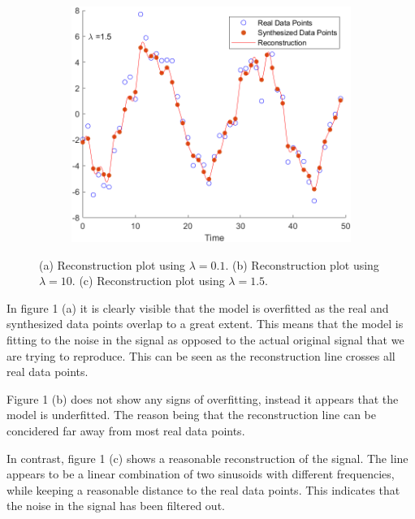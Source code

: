 \documentclass{article}
\begin{document}
\begin{figure}[h]
\\[\baselineskip]
\begin{subfigure}[h]{0.45\linewidth}
   \centering
   \includegraphics[width=\linewidth]{task43.png}
   \caption{}
   \label{fig:3}
\end{subfigure}
\centering
\caption{(a) Reconstruction plot using $\lambda = 0.1$. (b) Reconstruction plot using $\lambda = 10$. (c) Reconstruction plot using $\lambda = 1.5$.}
\end{figure}

In figure 1 (a) it is clearly visible that the model is overfitted as the real and synthesized data points overlap to a great extent. This means that the model is fitting to the noise in the signal as opposed to the actual original signal that we are trying to reproduce. This can be seen as the reconstruction line crosses all real data points.

Figure 1 (b) does not show any signs of overfitting, instead it appears that the model is underfitted. The reason being that the reconstruction line can be concidered far away from most real data points.

In contrast, figure 1 (c) shows a reasonable reconstruction of the signal. The line appears to be a linear combination of two sinusoids with different frequencies, while keeping a reasonable distance to the real data points. This indicates that the noise in the signal has been filtered out.


\begin{table}[h]
\centering
{}
\caption{Number of non-zero coordinates for each model presented in Figure 1.}
\centering
\end{table}
\end{document}
